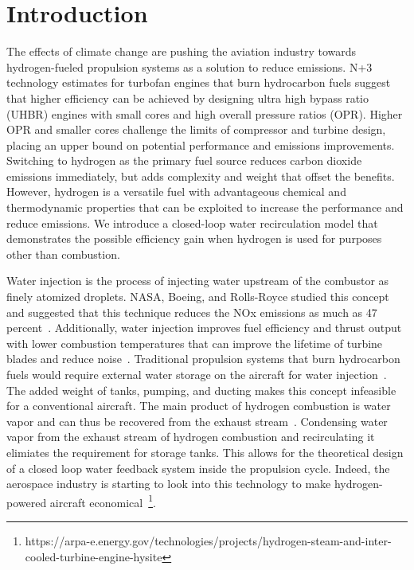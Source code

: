 \documentclass[conf]{new-aiaa}
\begin{document}
\section{Introduction}
The effects of climate change are pushing the aviation industry towards hydrogen-fueled propulsion systems as a solution to reduce emissions.
N+3 technology estimates for turbofan engines that burn hydrocarbon fuels suggest that higher efficiency can be achieved by designing ultra high bypass ratio (UHBR) engines with small cores and high overall pressure ratios (OPR).
Higher OPR and smaller cores challenge the limits of compressor and turbine design, placing an upper bound on potential performance and emissions improvements.
Switching to hydrogen as the primary fuel source reduces carbon dioxide emissions immediately, but adds complexity and weight that offset the benefits.
However, hydrogen is a versatile fuel with advantageous chemical and thermodynamic properties that can be exploited to increase the performance and reduce emissions.
We introduce a closed-loop water recirculation model that demonstrates the possible efficiency gain when hydrogen is used for purposes other than combustion.

Water injection is the process of injecting water upstream of the combustor as finely atomized droplets.
NASA, Boeing, and Rolls-Royce studied this concept and suggested that this technique reduces the NOx emissions as much as 47 percent~\cite{Daggett2010}.
Additionally, water injection improves fuel efficiency and thrust output with lower combustion temperatures that can improve the lifetime of turbine blades and reduce noise~\cite{Daggett2010}.
Traditional propulsion systems that burn hydrocarbon fuels would require external water storage on the aircraft for water injection~\cite{Mourouzidis2015}.
The added weight of tanks, pumping, and ducting makes this concept infeasible for a conventional aircraft.
The main product of hydrogen combustion is water vapor and can thus be recovered from the exhaust stream~\cite{Strom2002}.
Condensing water vapor from the exhaust stream of hydrogen combustion and recirculating it elimiates the requirement for storage tanks.
This allows for the theoretical design of a closed loop water feedback system inside the propulsion cycle.
Indeed, the aerospace industry is starting to look into this technology to make hydrogen-powered aircraft economical~\footnote{https://arpa-e.energy.gov/technologies/projects/hydrogen-steam-and-inter-cooled-turbine-engine-hysite}{}.
\end{document}
